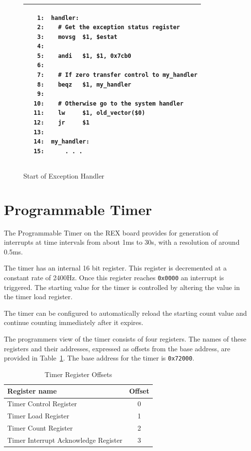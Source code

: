 \documentclass[a4paper,10pt]{article}
\begin{document}
\begin{enumerate}
\begin{figure}[h]
\begin{small}
\begin{center}
\begin{tabular}{|p{9cm}|}
\hline
\begin{verbatim}
   1:  handler:
   2:    # Get the exception status register
   3:    movsg  $1, $estat
   4:
   5:    andi   $1, $1, 0x7cb0
   6:
   7:    # If zero transfer control to my_handler
   8:    beqz   $1, my_handler
   9:
  10:    # Otherwise go to the system handler
  11:    lw     $1, old_vector($0)
  12:    jr     $1
  13:
  14:  my_handler:
  15:      . . . 	
\end{verbatim}
\\ \hline
\end{tabular}
\end{center}
\end{small}
\caption{Start of Exception Handler}
\label{code:handler}
\end{figure}
\end{enumerate}

\newpage
\appendix
\section{Programmable Timer}
\label{appen:timer}

The Programmable Timer on the REX board provides for generation of
interrupts at time intervals from about 1ms to 30s, with a resolution
of around 0.5ms.

The timer has an internal 16 bit register. This register is
decremented at a constant rate of 2400Hz. Once this register reaches
\texttt{0x0000} an interrupt is triggered. The starting value for the
timer is controlled by altering the value in the timer load register.

The timer can be configured to automatically reload the starting count
value and continue counting immediately after it expires.

The programmers view of the timer consists of four registers.  The
names of these registers and their addresses, expressed as offsets
from the base address, are provided in
Table~\ref{table:timer_offsets}.  The base address for the timer is
\texttt{0x72000}.

\begin{table}[h]
\begin{center}
\begin{tabular}{|l|c|}
\hline
\textbf{Register name} & \textbf{Offset} \\
\hline
Timer Control Register & 0 \\
\hline
Timer Load Register & 1 \\
\hline
Timer Count Register & 2 \\
\hline
Timer Interrupt Acknowledge Register & 3 \\
\hline
\end{tabular}
\caption{Timer Register Offsets}
\label{table:timer_offsets}
\end{center}
\end{table}
\end{document}
